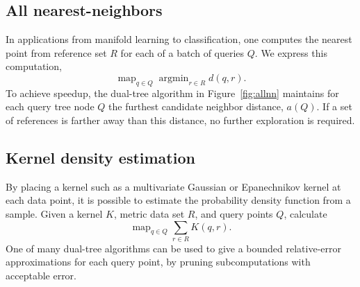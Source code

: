 \documentclass[twoside,leqno,twocolumn]{article}
\DeclareMathOperator*{\map}{map}
\DeclareMathOperator*{\argmin}{argmin}
\newcommand{\fig}[1]{Figure~\ref{fig:#1}}
\newcommand{\mysub}[1]{\subsection{#1} }
\newcommand{\ocpos}[1]{c^{+}_{#1}}
\newcommand{\cpos}[2]{\ocpos{#1 \neq #2}}
\newcommand{\simil}[2]{S_{#1#2}}
\newcommand{\vecrho}{\vec{\rho}}
\newcommand{\vecalpha}{\vec{\alpha}}
\newcommand{\frho}[1]{\rho_{#1}}
\newcommand{\falpha}[1]{\alpha_{#1}}
\newcommand{\falphaj}[2]{\alpha_{#1[#2]}}
\begin{document}
\mysub{All nearest-neighbors}
In applications from manifold learning to classification, one computes the nearest point from reference set $R$ for each of a batch of queries $Q$.
We express this computation,
\[\map_{q \in Q} \argmin_{r \in R} d(q,r).\]
\noindent To achieve speedup, the dual-tree algorithm in \fig{allnn} maintains for each query tree node $Q$ the furthest candidate neighbor distance, $a(Q)$.
If a set of references is farther away than this distance, no further exploration is required.

\mysub{Kernel density estimation}
By placing a kernel such as a multivariate Gaussian or Epanechnikov kernel at each data point, it is possible to estimate the probability density function from a sample.
Given a kernel $K$, metric data set $R$, and query points $Q$, calculate
\[\map_{q \in Q} \sum_{r \in R} K(q, r).\]
One of many dual-tree algorithms \cite{gray_kde, lee_gauss1, lee_gauss2} can be used to give a bounded relative-error approximations for each query point, by pruning subcomputations with acceptable error.


\end{document}
